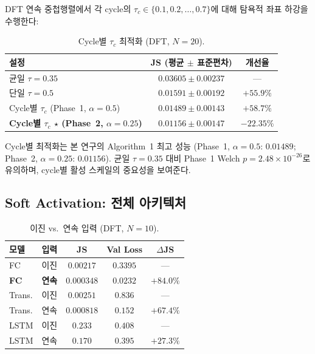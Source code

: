 \documentclass[conference,10pt,a4paper]{IEEEtran}
\begin{document}
DFT 연속 중첩행렬에서 각 cycle의
$\tau_c \in \{0.1, 0.2, \ldots, 0.7\}$에 대해
탐욕적 좌표 하강을 수행한다:

\begin{table}[t]
\centering
\caption{Cycle별 $\tau_c$ 최적화 (DFT, $N=20$).}
\label{tab:percycle}
\begin{tabular}{lcc}
\toprule
설정 & JS (평균 $\pm$ 표준편차) & 개선율 \\
\midrule
균일 $\tau = 0.35$ & $0.03605 \pm 0.00237$ & --- \\
단일 $\tau = 0.5$   & $0.01591 \pm 0.00192$ & $+55.9\%$ \\
Cycle별 $\tau_c$ (Phase~1, $\alpha=0.5$) & $0.01489 \pm 0.00143$ & $+58.7\%$ \\
\textbf{Cycle별 $\tau_c$ $\star$ (Phase~2, $\alpha=0.25$)} & $\mathbf{0.01156 \pm 0.00147}$ & $\mathbf{-22.35\%}$ \\
\bottomrule
\end{tabular}
\end{table}

Cycle별 최적화는 본 연구의 Algorithm~1 최고 성능
(Phase~1, $\alpha=0.5$: $0.01489$; Phase~2, $\alpha=0.25$: $\mathbf{0.01156}$).
균일 $\tau=0.35$ 대비 Phase~1 Welch $p = 2.48 \times 10^{-26}$로 유의하며,
cycle별 활성 스케일의 중요성을 보여준다.

\subsection{Soft Activation: 전체 아키텍처}
\label{subsec:soft}

\begin{table}[t]
\centering
\caption{이진 vs.\ 연속 입력 (DFT, $N=10$).}
\label{tab:soft}
\begin{tabular}{llccc}
\toprule
모델 & 입력 & JS & Val Loss & $\Delta$JS \\
\midrule
FC   & 이진 & $0.00217$ & $0.3395$ & --- \\
\textbf{FC} & \textbf{연속} & $\mathbf{0.000348}$ & $\mathbf{0.0232}$ & $\mathbf{+84.0\%}$ \\
Trans. & 이진 & $0.00251$ & $0.836$ & --- \\
Trans. & 연속 & $0.000818$ & $0.152$ & $+67.4\%$ \\
LSTM & 이진 & $0.233$ & $0.408$ & --- \\
LSTM & 연속 & $0.170$ & $0.395$ & $+27.3\%$ \\
\bottomrule
\end{tabular}
\end{table}
\end{document}
